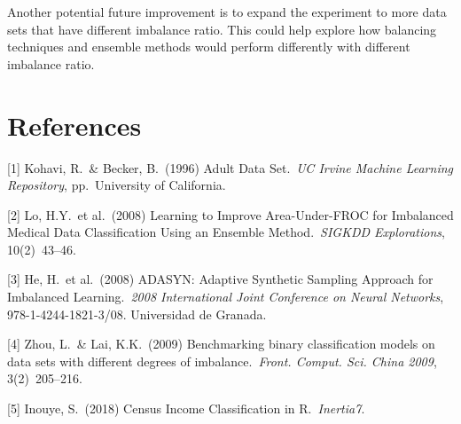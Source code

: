 \documentclass{article}
\begin{document}
Another potential future improvement is to expand the experiment to more data sets that have different imbalance ratio. This could help explore how balancing techniques and ensemble methods would perform differently with different imbalance ratio.

\section*{References}

\medskip

\small

[1] Kohavi, R.\ \& Becker, B.\ (1996) Adult Data Set.\ {\it UC Irvine Machine Learning Repository},
pp.\ University of California.

[2] Lo, H.Y.\ et al.\ (2008) Learning to Improve Area-Under-FROC for Imbalanced Medical Data Classification Using an Ensemble Method.\ {\it SIGKDD Explorations},
10(2)\ 43--46.

[3] He, H.\ et al.\ (2008) ADASYN: Adaptive Synthetic Sampling Approach for Imbalanced
Learning.\ {\it 2008 International Joint Conference on Neural Networks}, 978-1-4244-1821-3/08. Universidad de Granada.

[4] Zhou, L.\ \& Lai, K.K.\ (2009) Benchmarking binary classification models on data sets with different degrees of imbalance.\ {\it Front. Comput. Sci. China 2009},
3(2)\ 205--216.

[5] Inouye, S.\ (2018) Census Income Classification in R.\ {\it Inertia7}.
\end{document}
